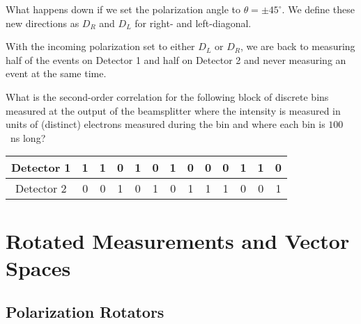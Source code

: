 What happens down if we set the polarization angle to $\theta=\pm45^\circ$. We define these new directions as $D_R$ and $D_L$ for right- and left-diagonal.\begin{marginfigure}\centering
{}
\end{marginfigure}
With the incoming polarization set to either $D_L$ or $D_R$, we are back to measuring half of the events on Detector 1 and half on Detector 2 and never measuring an event at the same time.

\begin{exercise}
What is the second-order correlation for the following block of discrete bins measured at the output of the beamsplitter  where the intensity is measured in units of (distinct) electrons measured during the bin and where each bin is $100$~ns long?
\begin{table}
\centering
\begin{tabular}{|c||c|c|c|c|c|c|c|c|c|c|c|c|}
\hline
Detector 1 & 1 & 1 & 0 & 1 & 0 & 1 & 0 & 0 & 0 & 1 & 1 & 0 \\ 
\hline
Detector 2 & 0 & 0 & 1 & 0 & 1 & 0 & 1 & 1 & 1 & 0 & 0 & 1\\
\hline
\end{tabular}
\end{table}


\end{exercise}

\chapter{Rotated Measurements and Vector Spaces}
\section{Polarization Rotators}

